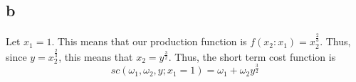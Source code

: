 \documentclass[11pt]{article}
\begin{document}

\subsection*{b}
Let $x_1 = 1$. This means that our production function is $f(x_2 : x_1) = x_2^\frac{2}{3}$. Thus, since $y = x_2^\frac{2}{3}$, this means that $x_2 = y^\frac{3}{2}$. Thus, the short term cost function is 
\[
sc(\omega_1, \omega_2, y; x_1 = 1) = \omega_1 + \omega_2 y^\frac{3}{2}
\]
\end{document}
